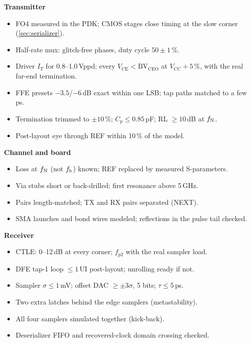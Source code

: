 {\small
{}
\noindent\begin{minipage}[t]{0.485\linewidth}
\textbf{\sffamily\color{navy}Transmitter}
\begin{itemize}
  \item FO4 measured in the PDK; CMOS stages close timing at the slow corner (\cref{sec:serializer}).
  \item Half-rate mux: glitch-free phases, duty cycle $50\pm1$\,\%.
  \item Driver $I_T$ for 0.8--1.0\,Vppd; every $V_\mathrm{CE}<\mathrm{BV}_\mathrm{CEO}$ at $V_\mathrm{CC}+5$\,\%, with the real far-end termination.
  \item FFE presets $-3.5$/$-6$\,dB exact within one LSB; tap paths matched to a few ps.
  \item Termination trimmed to $\pm10$\,\%; $C_p\le0.85$\,pF; RL $\ge10$\,dB at $f_\mathrm{N}$.
  \item Post-layout eye through REF within 10\,\% of the model.
\end{itemize}
\textbf{\sffamily\color{navy}Channel and board}
\begin{itemize}
  \item Loss at $f_\mathrm{N}$ (not $f_\mathrm{b}$) known; REF replaced by measured S-parameters.
  \item Via stubs short or back-drilled; first resonance above 5\,GHz.
  \item Pairs length-matched; TX and RX pairs separated (NEXT).
  \item SMA launches and bond wires modeled; reflections in the pulse tail checked.
\end{itemize}
\textbf{\sffamily\color{navy}Receiver}
\begin{itemize}
  \item CTLE: 0--12\,dB at every corner; $f_{p2}$ with the real sampler load.
  \item DFE tap-1 loop $\le1$\,UI post-layout; unrolling ready if not.
  \item Sampler $\sigma\le1$\,mV; offset DAC $\ge\pm3\sigma$, 5 bits; $\tau\le5$\,ps.
  \item Two extra latches behind the edge samplers (metastability).
  \item All four samplers simulated together (kick-back).
  \item Deserializer FIFO and recovered-clock domain crossing checked.
\end{itemize}
\end{minipage}\hfill
}

